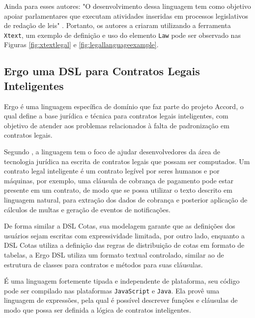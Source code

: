 \newpage
Ainda para esses autores: "O desenvolvimento dessa linguagem tem como objetivo apoiar parlamentares que executam atividades inseridas em processos legislativos de redação de leis"  \cite[p.45, tradução nossa]{legallanguage}. Portanto, os autores a criaram utilizando a ferramenta \texttt{Xtext}, um exemplo de definição e uso do elemento \texttt{Law} pode ser observado nas Figuras \ref{fig:xtextlegal} e \ref{fig:legallanguageexample}.








\newpage
\subsection{Ergo uma DSL para Contratos Legais Inteligentes}
\label{ergo}

Ergo é uma linguagem específica de domínio que faz parte do projeto Accord, o qual define a base jurídica e técnica para contratos legais inteligentes, com objetivo de atender aos problemas relacionados à falta de padronização em contratos legais. 

Segundo , a linguagem tem o foco de ajudar desenvolvedores da área de tecnologia jurídica na escrita de contratos legais que possam ser computados. Um contrato legal inteligente é um contrato legível por seres humanos e por máquinas, por exemplo, uma cláusula de cobrança de pagamento pode estar presente em um contrato, de modo que se possa utilizar o texto descrito em linguagem natural, para extração dos dados de cobrança e posterior aplicação de cálculos de multas e geração de eventos de notificações. 

De forma similar a DSL Cotas, sua modelagem garante que as definições dos usuários sejam escritas com expressividade limitada, por outro lado, enquanto a DSL Cotas utiliza a definição das regras de distribuição de cotas em formato de tabelas, a Ergo DSL utiliza um formato textual controlado, similar ao de estrutura de classes para contratos e métodos para suas cláusulas.

É uma linguagem fortemente tipada e independente de plataforma, seu código pode ser compilado nas plataformas \texttt{JavaScript} e \texttt{Java}. Ela provê uma linguagem de expressões, pela qual é possível descrever funções e cláusulas de modo que possa ser definida a lógica de contratos inteligentes.

